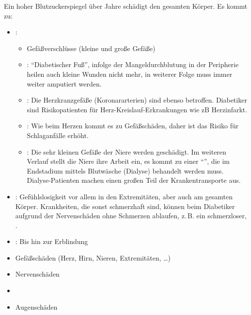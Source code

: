 {
{%
Ein hoher Blutzuckerspiegel über Jahre schädigt den gesamten
Körper. Es kommt zu:
\begin{itemize}
  \item {}: 
  \begin{itemize}
    \item Gefäßverschlüsse (kleine und große Gefäße)
    \item {}: \enquote{Diabetischer Fuß}, infolge der
    Mangeldurchblutung in der Peripherie heilen auch kleine
    Wunden nicht mehr, in weiterer Folge muss immer weiter
    amputiert werden.
    \item {}: Die Herzkranzgefäße (Koronar\-arterien)
    sind ebenso betroffen. Diabetiker sind Risikopatienten
    für Herz-Kreislauf-Erkrankungen wie zB Herz\-infarkt.
    \item {}: Wie beim Herzen kommt es zu
    Gefäßschäden, daher ist das Risiko für
    Schlaganfälle erhöht.
    \item {}: Die sehr kleinen Gefäße der Niere
    werden geschädigt. Im weiteren Verlauf stellt die Niere
    ihre Arbeit ein, es kommt zu einer
    \enquote{}, die im
    Endstadium mittels Blutwäsche (Dialyse) behandelt werden
    muss. Dialyse-Patienten machen einen großen Teil der
    Krankentransporte aus.
  \end{itemize}
  \item  {} :
  Gefühlslosigkeit vor allem in den Extremitäten, aber auch am
  gesamten Körper. Krankheiten, die sonst schmerzhaft sind,
  können beim Diabetiker aufgrund der Nervenschäden ohne
  Schmerzen ablaufen, z.\,B. ein schmerzloser, .
  \item  {}: Bis hin zur Erblindung
  
\end{itemize}

}{
\begin{itemize}
  \item Gefäßschäden (Herz, Hirn, Nieren, Extremitäten, \ldots)
  \item Nervenschäden
  \item {}
  \item Augenschäden
\end{itemize}
}{}{}{}








}
